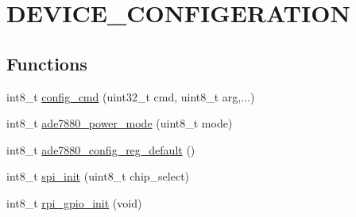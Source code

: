 \hypertarget{a00004}{\section{D\-E\-V\-I\-C\-E\-\_\-\-C\-O\-N\-F\-I\-G\-E\-R\-A\-T\-I\-O\-N}
\label{d0/d0b/a00004}
}








  


\subsection*{Functions}
\begin{DoxyCompactItemize}
\item 
int8\-\_\-t \hyperlink{a00004_ga369ee0e8379941cbc2c79b90ec3292da}{config\-\_\-cmd} (uint32\-\_\-t cmd, uint8\-\_\-t arg,...)
\begin{DoxyCompactList}\small\item\em 

 \end{DoxyCompactList}\item 
int8\-\_\-t \hyperlink{a00004_gae9a5abd4e5054e7ea3f149b1764f2cd0}{ade7880\-\_\-power\-\_\-mode} (uint8\-\_\-t mode)
\begin{DoxyCompactList}\small\item\em 

 \end{DoxyCompactList}\item 
int8\-\_\-t \hyperlink{a00004_ga7782772c18e6ea515dcd28dcaedd0f06}{ade7880\-\_\-config\-\_\-reg\-\_\-default} ()
\begin{DoxyCompactList}\small\item\em 

 \end{DoxyCompactList}\end{DoxyCompactItemize}
\begin{DoxyCompactItemize}
\item 
int8\-\_\-t \hyperlink{a00004_ga96ddfd5c89b80852982ba50dd18256f6}{spi\-\_\-init} (uint8\-\_\-t chip\-\_\-select)
\begin{DoxyCompactList}\small\item\em 

 \end{DoxyCompactList}\end{DoxyCompactItemize}
\begin{DoxyCompactItemize}
\item 
int8\-\_\-t \hyperlink{a00004_ga156b48448f55534a2f9c805a1f760efa}{rpi\-\_\-gpio\-\_\-init} (void)
\begin{DoxyCompactList}\small\item\em 

 \end{DoxyCompactList}\end{DoxyCompactItemize}


